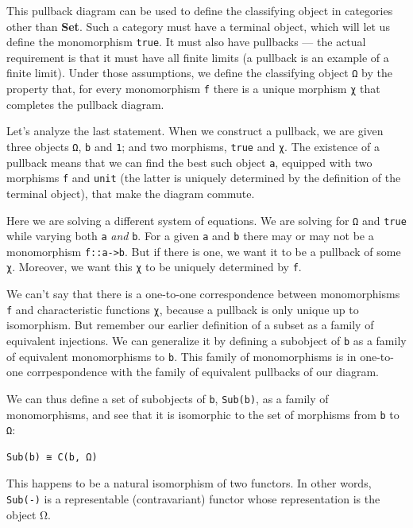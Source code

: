This pullback diagram can be used to define the classifying object in
categories other than \textbf{Set}. Such a category must have a terminal
object, which will let us define the monomorphism \texttt{true}. It must
also have pullbacks --- the actual requirement is that it must have all
finite limits (a pullback is an example of a finite limit). Under those
assumptions, we define the classifying object \texttt{Ω} by the property
that, for every monomorphism \texttt{f} there is a unique morphism
\texttt{χ} that completes the pullback diagram.

Let's analyze the last statement. When we construct a pullback, we are
given three objects \texttt{Ω}, \texttt{b} and \texttt{1}; and two
morphisms, \texttt{true} and \texttt{χ}. The existence of a pullback
means that we can find the best such object \texttt{a}, equipped with
two morphisms \texttt{f} and \texttt{unit} (the latter is uniquely
determined by the definition of the terminal object), that make the
diagram commute.

Here we are solving a different system of equations. We are solving for
\texttt{Ω} and \texttt{true} while varying both \texttt{a} \emph{and}
\texttt{b}. For a given \texttt{a} and \texttt{b} there may or may not
be a monomorphism \texttt{f::a-\textgreater{}b}. But if there is one, we
want it to be a pullback of some \texttt{χ}. Moreover, we want this
\texttt{χ} to be uniquely determined by \texttt{f}.

We can't say that there is a one-to-one correspondence between
monomorphisms \texttt{f} and characteristic functions \texttt{χ},
because a pullback is only unique up to isomorphism. But remember our
earlier definition of a subset as a family of equivalent injections. We
can generalize it by defining a subobject of \texttt{b} as a family of
equivalent monomorphisms to \texttt{b}. This family of monomorphisms is
in one-to-one corrpespondence with the family of equivalent pullbacks of
our diagram.

We can thus define a set of subobjects of \texttt{b}, \texttt{Sub(b)},
as a family of monomorphisms, and see that it is isomorphic to the set
of morphisms from \texttt{b} to \texttt{Ω}:

\begin{verbatim}
Sub(b) ≅ C(b, Ω)
\end{verbatim}

This happens to be a natural isomorphism of two functors. In other
words, \texttt{Sub(-)} is a representable (contravariant) functor whose
representation is the object Ω.

